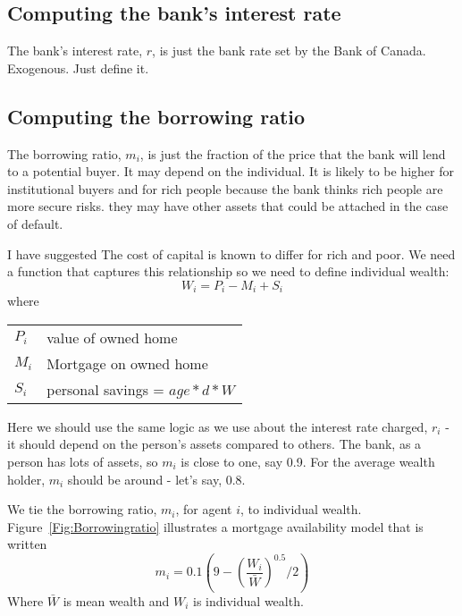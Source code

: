 \subsection{Computing the bank's interest rate}
The bank's interest rate, $r$, is just the bank rate set by the Bank of Canada. Exogenous. Just define it.


\subsection{Computing the borrowing ratio}
The borrowing ratio, $m_i$, is just the fraction of the price that the bank will lend to a potential buyer. It may depend on the individual. It is likely to be higher for institutional buyers  and for rich people because the bank thinks rich people are more secure risks. they may have other assets that could be attached in the case of default.

I have suggested The cost of capital is known to differ for rich and poor. We need a function that captures this relationship so we need to define individual wealth:
\[W_i= P_i -M_i  +S_i\]
where 

\begin{tabular}{ll}
$P_i$ & value of owned home\\
$M_i$ & Mortgage on owned home\\
$S_i$ & personal savings = $age*d*W$\\
\end{tabular}

Here we should use the same logic as we use about the interest rate charged, $r_i$ - it should depend on the person's assets compared to others. The bank, as a person has lots of assets, so $m_i$ is close to one, say 0.9. For the average wealth holder, $m_i$ should be around - let's say, 0.8. 

We  tie the borrowing ratio, $m_i$,  for agent $i$, to individual wealth. Figure~\ref{Fig:Borrowingratio} illustrates a mortgage availability  model that is written 
 \[ m_i = 0.1(9-\left(\frac{W_i}{\bar W}\right)^{0.5}/2 )\]
Where $\bar{W}$ is mean wealth and $W_i$ is individual wealth. 

